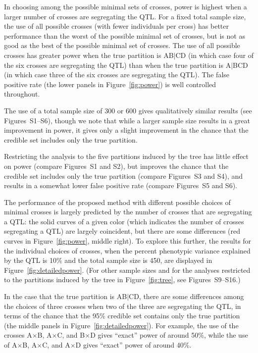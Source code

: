\documentclass[12pt,letterpaper]{article}
\begin{document}
In choosing among the possible minimal sets of crosses, power is
highest when a larger number of crosses are segregating the QTL.  For
a fixed total sample size, the use of all possible crosses (with fewer
individuals per cross) has better performance than the worst of the
possible minimal set of crosses, but is not as good as the best of the
possible minimal set of crosses.  The use of all possible crosses has
greater power when the true partition is AB$|$CD (in which case four
of the six crosses are segregating the QTL) than when the true
partition is A$|$BCD (in which case three of the six crosses are
segregating the QTL).  The false positive rate (the lower panels in
Figure~\ref{fig:power}) is well controlled throughout.  

The use of a total sample size of 300 or 600 gives qualitatively
similar results (see Figures~S1--S6), though we note that while a
larger sample size results in a great improvement in power, it gives
only a slight improvement in the chance that the credible set includes
only the true partition.

Restricting the analysis to the five partitions induced by the tree
has little effect on power (compare Figures~S1 and S2), but improves
the chance that the credible set includes only the true partition
(compare Figures~S3 and S4), and results in a somewhat lower false
positive rate (compare Figures~S5 and S6).

The performance of the proposed method with different possible choices
of minimal crosses is largely predicted by the number of crosses that
are segregating a QTL: the solid curves of a given color (which
indicates the number of crosses segregating a QTL) are largely
coincident, but there are some differences (red curves in
Figure~\ref{fig:power}, middle right).
To explore this further, the results for the individual choices of
crosses, when the percent phenotypic variance explained by the QTL is
10\% and the total sample size is 450, are displayed in
Figure~\ref{fig:detailedpower}.  (For other sample sizes and for the
analyses restricted to the partitions induced by the tree in
Figure~\ref{fig:tree}, see Figures~S9--S16.)

In the case that the true partition is AB$|$CD, there are some
differences among the choices of three crosses when two of
the three are segregating the QTL, in terms of the chance that the 95\% credible set
contains only the true partition (the middle panels in
Figure~\ref{fig:detailedpower}).  For example, the use of the crosses
A$\times$B, A$\times$C, and B$\times$D gives
``exact'' power of around 50\%, while the use of A$\times$B,
A$\times$C, and A$\times$D gives ``exact'' power
of around 40\%.  
\end{document}
